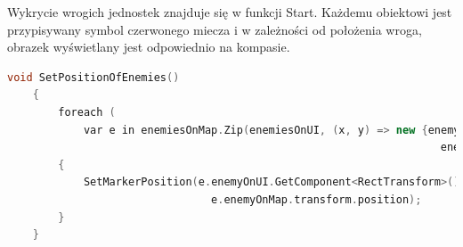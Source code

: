 Wykrycie wrogich jednostek znajduje się w funkcji Start. Każdemu obiektowi jest przypisywany symbol czerwonego miecza i w zależności od położenia wroga, obrazek wyświetlany jest odpowiednio na kompasie.
\begin{lstlisting}[language=C++, caption=Fragment kodu odpowiedzialny za połączenie wrogich obiektów na mapie z symbolami wyświetlonymi na kompasie]
    void SetPositionOfEnemies()
    {
        foreach (
            var e in enemiesOnMap.Zip(enemiesOnUI, (x, y) => new {enemyOnMap = x, 
                                                                    enemyOnUI = y }))
        {
            SetMarkerPosition(e.enemyOnUI.GetComponent<RectTransform>(), 
                                e.enemyOnMap.transform.position);
        }
    }
\end{lstlisting}
